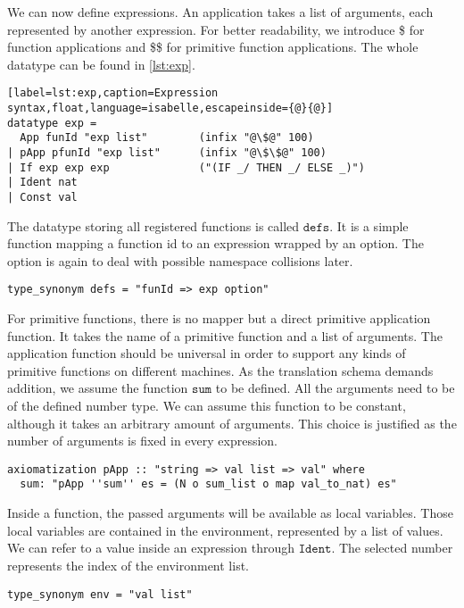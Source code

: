 We can now define expressions.
An application takes a list of arguments, each represented by another expression.
For better readability, we introduce \$ for function applications and \$\$ for primitive function applications.
The whole datatype can be found in \autoref{lst:exp}.
\begin{lstlisting}[label=lst:exp,caption=Expression syntax,float,language=isabelle,escapeinside={@}{@}]
datatype exp =
  App funId "exp list"        (infix "@\$@" 100)
| pApp pfunId "exp list"      (infix "@\$\$@" 100)
| If exp exp exp              ("(IF _/ THEN _/ ELSE _)")
| Ident nat
| Const val
\end{lstlisting}

The datatype storing all registered functions is called $\texttt{defs}$.
It is a simple function mapping a function id to an expression wrapped by an option.
The option is again to deal with possible namespace collisions later.
\begin{lstlisting}[mathescape=true,language=isabelle]
type_synonym defs = "funId => exp option"
\end{lstlisting}

For primitive functions, there is no mapper but a direct primitive application function.
It takes the name of a primitive function and a list of arguments.
The application function should be universal in order to support any kinds of primitive functions on different machines.
As the translation schema demands addition, we assume the function $\texttt{sum}$ to be defined.
All the arguments need to be of the defined number type.
We can assume this function to be constant, although it takes an arbitrary amount of arguments.
This choice is justified as the number of arguments is fixed in every expression.
\begin{lstlisting}[mathescape=true,language=isabelle]
axiomatization pApp :: "string => val list => val" where
  sum: "pApp ''sum'' es = (N o sum_list o map val_to_nat) es"
\end{lstlisting}

Inside a function, the passed arguments will be available as local variables.
Those local variables are contained in the environment, represented by a list of values.
We can refer to a value inside an expression through $\texttt{Ident}$.
The selected number represents the index of the environment list.
\begin{lstlisting}[language=isabelle]
type_synonym env = "val list"
\end{lstlisting}

